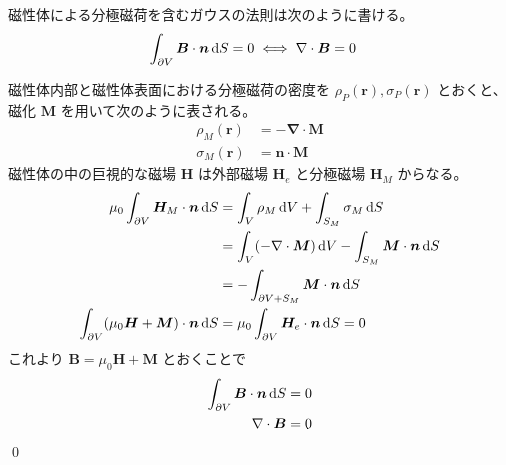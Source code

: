 \documentclass[uplatex,dvipdfmx,a4paper,11pt]{jlreq}
\makeatletter
\newcommand{\BB}{\bm{B}}
\newcommand{\HH}{\bm{H}}
\newcommand{\MM}{\bm{M}}
\newcommand{\rr}{\bm{r}}
\newcommand{\vnabla}{\mathbf{\nabla}}
\numberwithin{equation}{section}
\theoremstyle{definition}
\renewenvironment{proof}[1][\proofname]{\par
  \normalfont
  \topsep6\p@\@plus6\p@ \trivlist
  \item[\hskip\labelsep{\bfseries #1}\@addpunct{\bfseries}]\ignorespaces\quad\par
}{%
  \qed\endtrivlist\@endpefalse
}
\renewcommand\proofname{証明}
\makeatother
\begin{document}
\begin{theorem}[磁場におけるガウスの法則]
  磁性体による分極磁荷を含むガウスの法則は次のように書ける。
  \begin{align}
    \int_{\partial V}\BB\cdot\bm{n}\dl{S} & = 0 \iff \vnabla\cdot\BB = 0
  \end{align}
\end{theorem}
\begin{proof}
  磁性体内部と磁性体表面における分極磁荷の密度を $\rho_P(\rr), \sigma_P(\rr)$ とおくと、磁化 $\MM$ を用いて次のように表される。
  \begin{align}
    \rho_M(\rr)   & = - \vnabla\cdot\MM \\
    \sigma_M(\rr) & = \bm{n}\cdot\MM
  \end{align}
  磁性体の中の巨視的な磁場 $\HH$ は外部磁場 $\HH_e$ と分極磁場 $\HH_M$ からなる。
  \begin{align}
    \mu_0\int_{\partial V}\HH_M\cdot\bm{n}\dl{S}       & = \int_V\rho_M\dl{V} + \int_{S_M}\sigma_M\dl{S}                   \\
                                                       & = \int_V(-\vnabla\cdot\MM)\dl{V} - \int_{S_M}\MM\cdot\bm{n}\dl{S} \\
                                                       & = -\int_{\partial V + S_M}\MM\cdot\bm{n}\dl{S}                    \\
    \int_{\partial V}(\mu_0\HH + \MM)\cdot\bm{n}\dl{S} & = \mu_0\int_{\partial V}\HH_e\cdot\bm{n}\dl{S} = 0
  \end{align}
  これより $\BB = \mu_0\HH + \MM$ とおくことで
  \begin{align}
    \int_{\partial V}\BB\cdot\bm{n}\dl{S} & = 0 \\
    \vnabla\cdot\BB                       & = 0
  \end{align}
\end{proof}
\end{document}
